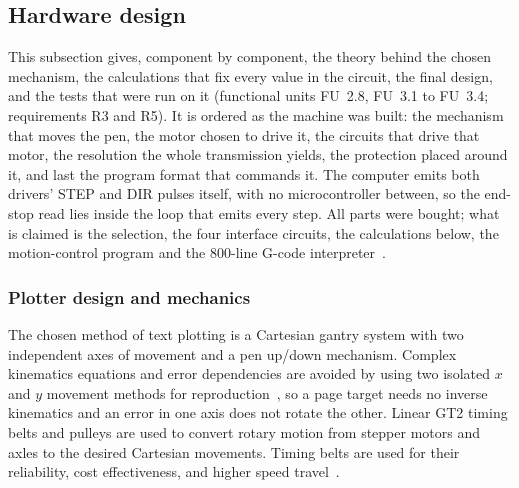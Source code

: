 %
%
\subsection{Hardware design}
\label{sec:gantry}

\begingroup
\setlength{\abovedisplayskip}{2pt}\setlength{\belowdisplayskip}{2pt}
\setlength{\abovedisplayshortskip}{1pt}\setlength{\belowdisplayshortskip}{1pt}

This subsection gives, component by component, the theory behind the chosen mechanism, the calculations that fix every value in the circuit, the final design, and the tests that were run on it (functional units FU~2.8, FU~3.1 to FU~3.4; requirements R3 and R5). It is ordered as the machine was built: the mechanism that moves the pen, the motor chosen to drive it, the circuits that drive that motor, the resolution the whole transmission yields, the protection placed around it, and last the program format that commands it. The computer emits both drivers' STEP and DIR pulses itself, with no microcontroller between, so the end-stop read lies inside the loop that emits every step. All parts were bought; what is claimed is the selection, the four interface circuits, the calculations below, the motion-control program and the 800-line G-code interpreter~\cite{iso6983}.

\subsubsection{Plotter design and mechanics}
\label{sec:gan-mech}

The chosen method of text plotting is a Cartesian gantry system with two independent axes of movement and a pen up/down mechanism. Complex kinematics equations and error dependencies are avoided by using two isolated $x$ and $y$ movement methods for reproduction~\cite{teikari2016}, so a page target needs no inverse kinematics and an error in one axis does not rotate the other. Linear GT2 timing belts and pulleys are used to convert rotary motion from stepper motors and axles to the desired Cartesian movements. Timing belts are used for their reliability, cost effectiveness, and higher speed travel~\cite{iqs2024}.

